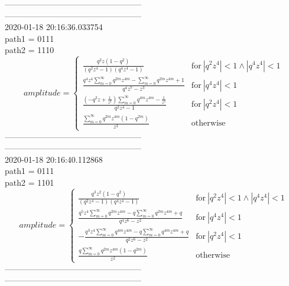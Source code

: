 \documentclass{jsreport}
\begin{document}
--------------------------------------------------\\
--------------------------------------------------\\
2020-01-18 20:16:36.033754\\
path1 = 0111\\
path2 = 1110\\
$$amplitude = \begin{cases} \frac{q^{2} z \left(1 - q^{2}\right)}{\left(q^{2} z^{4} - 1\right) \left(q^{4} z^{4} - 1\right)} & \text{for}\: \left|{q^{2} z^{4}}\right| < 1 \wedge \left|{q^{4} z^{4}}\right| < 1 \\\frac{q^{4} z^{4} \sum_{m=0}^{\infty} q^{2 m} z^{4 m} - \sum_{m=0}^{\infty} q^{2 m} z^{4 m} + 1}{q^{4} z^{7} - z^{3}} & \text{for}\: \left|{q^{4} z^{4}}\right| < 1 \\\frac{\left(- q^{2} z + \frac{1}{z^{3}}\right) \sum_{m=0}^{\infty} q^{4 m} z^{4 m} - \frac{1}{z^{3}}}{q^{2} z^{4} - 1} & \text{for}\: \left|{q^{2} z^{4}}\right| < 1 \\\frac{\sum_{m=0}^{\infty} q^{2 m} z^{4 m} \left(1 - q^{2 m}\right)}{z^{3}} & \text{otherwise} \end{cases}$$
--------------------------------------------------\\
--------------------------------------------------\\
2020-01-18 20:16:40.112868\\
path1 = 0111\\
path2 = 1101\\
$$amplitude = \begin{cases} \frac{q^{3} z^{2} \left(1 - q^{2}\right)}{\left(q^{2} z^{4} - 1\right) \left(q^{4} z^{4} - 1\right)} & \text{for}\: \left|{q^{2} z^{4}}\right| < 1 \wedge \left|{q^{4} z^{4}}\right| < 1 \\\frac{q^{5} z^{4} \sum_{m=0}^{\infty} q^{2 m} z^{4 m} - q \sum_{m=0}^{\infty} q^{2 m} z^{4 m} + q}{q^{4} z^{6} - z^{2}} & \text{for}\: \left|{q^{4} z^{4}}\right| < 1 \\- \frac{q^{3} z^{4} \sum_{m=0}^{\infty} q^{4 m} z^{4 m} - q \sum_{m=0}^{\infty} q^{4 m} z^{4 m} + q}{q^{2} z^{6} - z^{2}} & \text{for}\: \left|{q^{2} z^{4}}\right| < 1 \\\frac{q \sum_{m=0}^{\infty} q^{2 m} z^{4 m} \left(1 - q^{2 m}\right)}{z^{2}} & \text{otherwise} \end{cases}$$
--------------------------------------------------\\
--------------------------------------------------\\
\end{document}
